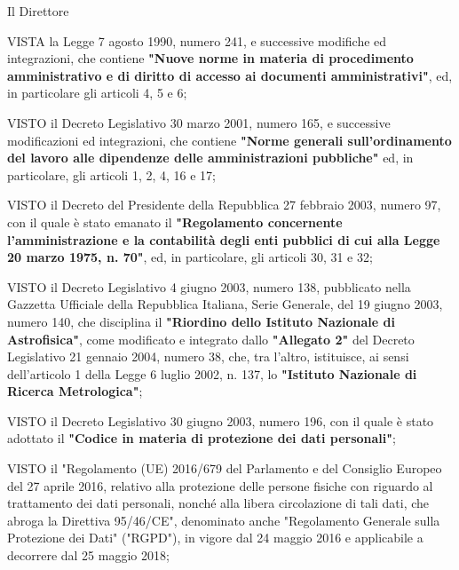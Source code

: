 

\vspace{0.5cm}
\begin{center}
Il Direttore
\end{center}

\begin{list}{VALUTATA}{}

\item[VISTA]
la Legge 7 agosto 1990, numero 241, e successive modifiche ed integrazioni, che contiene
\textbf{"Nuove norme in materia di procedimento amministrativo e di diritto di accesso ai
documenti amministrativi"}, ed, in particolare gli articoli 4, 5 e 6;

\item[VISTO]
il Decreto Legislativo 30 marzo 2001, numero 165, e successive modificazioni ed integrazioni, che contiene
\textbf{"Norme generali  sull'ordinamento del lavoro alle dipendenze delle amministrazioni pubbliche"}
ed, in particolare, gli articoli 1, 2, 4, 16 e 17;

\item[VISTO]
il Decreto del Presidente della Repubblica 27 febbraio 2003, numero 97, con il quale è stato emanato il
\textbf{"Regolamento concernente l'amministrazione e la contabilità degli enti pubblici di cui alla Legge
	20 marzo 1975, n. 70"}, ed, in particolare, gli articoli 30, 31 e 32; 

\item[VISTO]
il Decreto Legislativo 4 giugno 2003, numero 138, pubblicato nella Gazzetta Ufficiale della Repubblica Italiana,
Serie Generale, del 19 giugno 2003, numero 140, che disciplina il \textbf{"Riordino dello Istituto Nazionale
di Astrofisica"}, come modificato e integrato dallo \textbf{"Allegato 2"} del Decreto Legislativo 21 gennaio 2004,
numero 38, che, tra l'altro, istituisce, ai sensi dell'articolo 1 della Legge 6 luglio 2002, n. 137, lo
\textbf{"Istituto Nazionale di Ricerca Metrologica"};

\item[VISTO]
il Decreto Legislativo 30 giugno 2003, numero 196, con il quale è stato adottato il
\textbf{"Codice in materia di protezione dei dati personali"};

\item[VISTO]
il "Regolamento (UE) 2016/679 del Parlamento e del Consiglio Europeo del 27 aprile 2016, relativo
alla protezione delle persone fisiche con riguardo al trattamento dei dati personali, nonché alla
libera circolazione di tali dati, che abroga la Direttiva 95/46/CE", denominato anche
"Regolamento Generale sulla Protezione dei Dati" ("RGPD"), in vigore dal 24 maggio 2016 e
applicabile a decorrere dal 25 maggio 2018;


\end{list}

